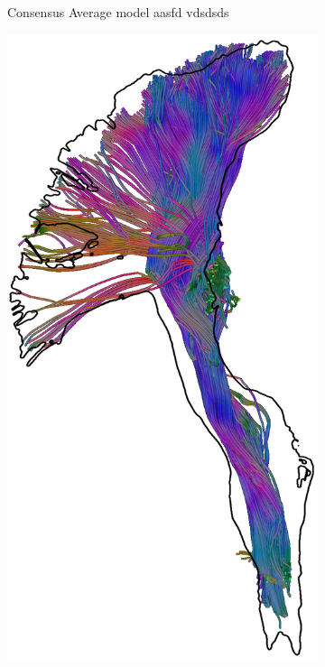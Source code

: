 \begin{figure}[t]
\begin{minipage}{0.19\linewidth}
\begin{subfigure}[b]{\linewidth}
		\caption{Consensus Average model{\color{white} aasfd vdsdsds}}
\end{subfigure} 
	\end{minipage} \hfil 
	\begin{minipage}{0.19\linewidth} 
	\begin{subfigure}[b]{\linewidth}
		\includegraphics[width=\linewidth]{cst-sel-c}

\end{subfigure}
\end{minipage}
\end{figure}
